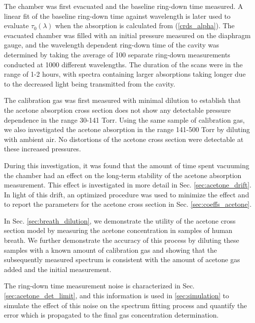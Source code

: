 \documentclass[8pt,a4paper]{report}
\begin{document}
	The chamber was first evacuated and the baseline ring-down time measured. A linear fit of the baseline ring-down time against wavelength is later used to evaluate $\tau_0 (\lambda)$ when the absorption is calculated from (\ref{crds_alpha}). The evacuated chamber was filled with an initial pressure measured on the diaphragm gauge, and the wavelength dependent ring-down time of the cavity was determined by taking the average of 100 separate ring-down measurements conducted at 1000 different wavelengths. The duration of the scans were in the range of 1-2 hours, with spectra containing larger absorptions taking longer due to the decreased light being transmitted from the cavity.
	
	The calibration gas was first measured with minimal dilution to establish that the acetone absorption cross section does not show any detectable pressure dependence in the range 30-141 Torr. Using the same sample of calibration gas, we also investigated the acetone absorption in the range 141-500 Torr by diluting with ambient air. No distortions of the acetone cross section were detectable at these increased pressures.
	
	During this investigation, it was found that the amount of time spent vacuuming the chamber had an effect on the long-term stability of the acetone absorption measurement. This effect is investigated in more detail in Sec. \ref{sec:acetone_drift}. In light of this drift, an optimized procedure was used to minimize the effect and to report the parameters for the acetone cross section in Sec. \ref{sec:coeffs_acetone}.
	
	In Sec. \ref{sec:breath_dilution}, we demonstrate the utility of the acetone cross section model by measuring the acetone concentration in samples of human breath. We further demonstrate the accuracy of this process by diluting these samples with a known amount of calibration gas and showing that the subsequently measured spectrum is consistent with the amount of acetone gas added and the initial measurement.
	
	The ring-down time measurement noise is characterized in Sec. \ref{sec:acetone_det_limit}, and this information is used in \ref{sec:simulation} to simulate the effect of this noise on the spectrum fitting process and quantify the error which is propagated to the final gas concentration determination.
	
\end{document}
